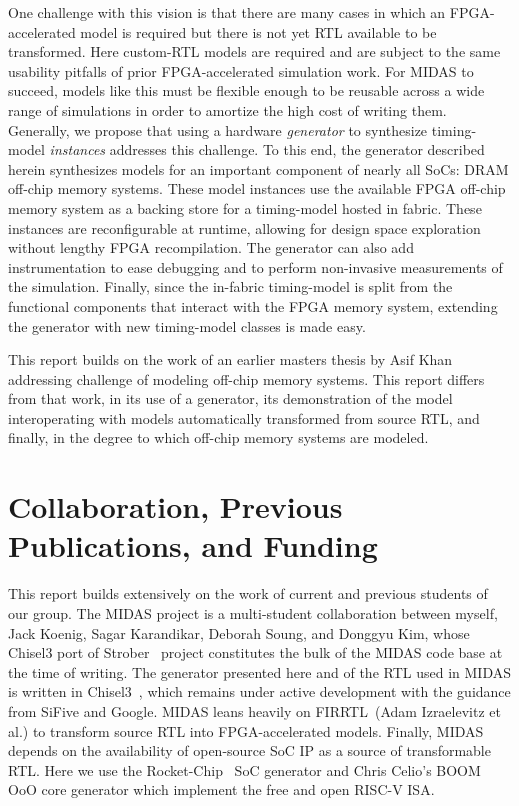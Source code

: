 One challenge with this vision is that there are many cases in which an
FPGA-accelerated model is required but there is not yet RTL available to be
transformed. Here custom-RTL models are required and are subject to the same
usability pitfalls of prior FPGA-accelerated simulation work. For MIDAS to
succeed, models like this must be flexible enough to be reusable across a wide
range of simulations in order to amortize the high cost of writing them.
Generally, we propose that using a hardware \emph{generator} to synthesize
timing-model \emph{instances} addresses this challenge. To this end, the
generator described herein synthesizes models for an important component of
nearly all SoCs: DRAM off-chip memory systems. These model instances use the
available FPGA off-chip memory system as a backing store for a timing-model
hosted in fabric. These instances are reconfigurable at runtime, allowing for
design space exploration without lengthy FPGA recompilation. The generator can
also add instrumentation to ease debugging and to perform non-invasive
measurements of the simulation. Finally, since the in-fabric timing-model is
split from the functional components that interact with the FPGA memory
system, extending the generator with new timing-model classes is made easy.

This report builds on the work of an earlier masters thesis by Asif
Khan~\cite{khanmasters} addressing challenge of modeling off-chip memory
systems. This report differs from that work, in its use of a generator, its
demonstration of the model interoperating with models automatically transformed
from source RTL, and finally, in the degree to which off-chip memory systems
are modeled.

\section{Collaboration, Previous Publications, and Funding}

This report builds extensively on the work of current and previous students of
our group. The MIDAS project is a multi-student collaboration between myself,
Jack Koenig, Sagar Karandikar, Deborah Soung, and Donggyu Kim, whose Chisel3
port of Strober~\cite{strober} project constitutes the bulk of the MIDAS code
base at the time of writing. The generator presented here and of the RTL used
in MIDAS is written in Chisel3~\cite{chisel}, which remains under active
development with the guidance from SiFive and Google. MIDAS leans heavily on
FIRRTL~\cite{firrtl}(Adam Izraelevitz et al.) to transform source RTL into
FPGA-accelerated models. Finally, MIDAS depends on the availability of
open-source SoC IP as a source of transformable RTL. Here we use the
Rocket-Chip~\cite{rocketchip} SoC generator and Chris Celio's BOOM~\cite{boom}
OoO core generator which implement the free and open RISC-V ISA.

